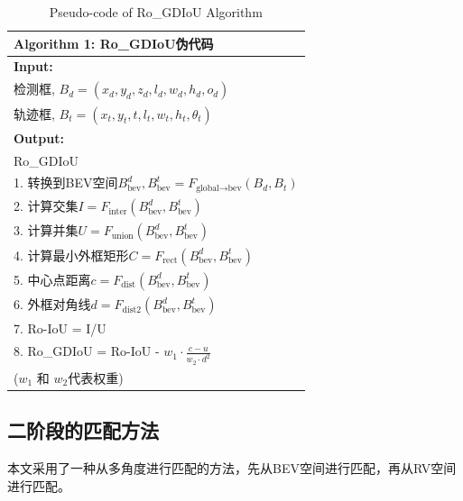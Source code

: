 \begin{table}[htbp]
	\centering
	\caption{Pseudo-code of Ro\_GDIoU Algorithm}
	\begin{tabular}{p{}}
		\toprule
		\textbf{Algorithm 1: Ro\_GDIoU伪代码} \\
		\midrule
		\textbf{Input:} \\
		检测框, $B_d = (x_d, y_d, z_d, l_d, w_d, h_d, o_d)$ \\
		轨迹框, $B_t = (x_t, y_t, t, l_t, w_t, h_t, \theta_t)$ \\
		\textbf{Output:} \\
		Ro\_GDIoU \\
		\midrule
		1. 转换到BEV空间$B_{\text{bev}}^d, B_{\text{bev}}^t = F_{\text{global} \rightarrow \text{bev}}(B_d, B_t)$ \\
		2. 计算交集$I = F_{\text{inter}}(B_{\text{bev}}^d, B_{\text{bev}}^t)$ \\
		3. 计算并集$U = F_{\text{union}}(B_{\text{bev}}^d, B_{\text{bev}}^t)$ \\
		4. 计算最小外框矩形$C = F_{\text{rect}}(B_{\text{bev}}^d, B_{\text{bev}}^t)$ \\
		5. 中心点距离$c = F_{\text{dist}}(B_{\text{bev}}^d, B_{\text{bev}}^t)$ \\
		6. 外框对角线$d = F_{\text{dist2}}(B_{\text{bev}}^d, B_{\text{bev}}^t)$ \\
		7. Ro-IoU = I/U \\
		8. Ro\_GDIoU = Ro-IoU - $w_1 \cdot \frac{c-u}{w_2 \cdot d^2}$ \\
		($w_1$ 和 $w_2$代表权重) \\
		\bottomrule
	\end{tabular}
\end{table}

\subsection{二阶段的匹配方法}
本文采用了一种从多角度进行匹配的方法，先从BEV空间进行匹配，再从RV空间进行匹配。

